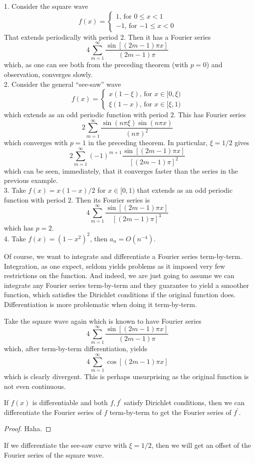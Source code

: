 \begin{example}
    1. Consider the square wave
    $$f(x)=\begin{cases}
        1\text{, for $0\le x<1$}\\
        -1\text{, for $-1\le x<0$}
    \end{cases}$$
    That extends periodically with period $2$.
    Then it has a Fourier series
    $$4\sum_{m=1}^\infty\frac{\sin[(2m-1)\pi x]}{(2m-1)\pi}$$
    which, as one can see both from the preceding theorem (with $p=0$) and observation, converges slowly.\\
    2. Consider the general ``see-saw'' wave
    $$f(x)=\begin{cases}
        x(1-\xi)\text{, for $x\in[0,\xi)$}\\
        \xi(1-x)\text{, for $x\in[\xi,1)$}
    \end{cases}$$
    which extends as an odd periodic function with period $2$.
    This has Fourier series
    $$2\sum_{m=1}^\infty\frac{\sin (n\pi\xi)\sin (n\pi x)}{(n\pi)^2}$$
    which converges with $p=1$ in the preceding theorem.
    In particular, $\xi=1/2$ gives
    $$2\sum_{m=1}^\infty(-1)^{m+1}\frac{\sin[(2m-1)\pi x]}{[(2m-1)\pi]^2}$$
    which can be seen, immediately, that it converges faster than the series in the previous example.\\
    3. Take $f(x)=x(1-x)/2$ for $x\in[0,1)$ that extends as an odd periodic function with period $2$.
    Then its Fourier series is
    $$4\sum_{m=1}^\infty\frac{\sin[(2m-1)\pi x]}{[(2m-1)\pi]^3}$$
    which has $p=2$.\\
    4. Take $f(x)=(1-x^2)^2$, then $a_n=O(n^{-4})$.
\end{example}
Of course, we want to integrate and differentiate a Fourier series term-by-term.
Integration, as one expect, seldom yields problems as it imposed very few restrictions on the function.
And indeed, we are just going to assume we can integrate any Fourier series term-by-term and they guarantee to yield a smoother function, which satisfies the Dirichlet conditions if the original function does.\\
Differentiation is more problematic when doing it term-by-term.
\begin{example}
    Take the square wave again which is known to have Fourier series
    $$4\sum_{m=1}^\infty\frac{\sin[(2m-1)\pi x]}{(2m-1)\pi}$$
    which, after term-by-term differentiation, yields
    $$4\sum_{m=1}^\infty\cos[(2m-1)\pi x]$$
    which is clearly divergent.
    This is perhaps unsurprising as the original function is not even continuous.
\end{example}
\begin{theorem}
    If $f(x)$ is differentiable and both $f,f^\prime$ satisfy Dirichlet conditions, then we can differentiate the Fourier series of $f$ term-by-term to get the Fourier series of $f^\prime$.
\end{theorem}
\begin{proof}
    Haha.
\end{proof}
\begin{example}
    If we differentiate the see-saw curve with $\xi=1/2$, then we will get an offset of the Fourier series of the square wave.
\end{example}
